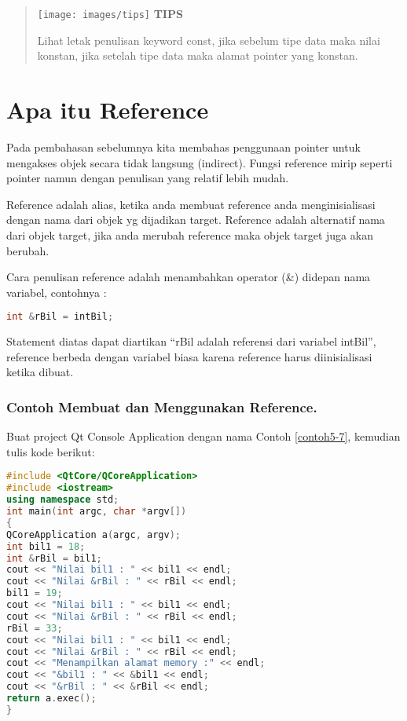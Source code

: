 \begin{quotation}
\texttt{[image: images/tips]}	\textbf{TIPS}
	
	Lihat
	letak penulisan keyword const, jika sebelum tipe data maka nilai
	konstan, jika setelah tipe data maka alamat pointer yang konstan.
\end{quotation}
 

\section{Apa itu Reference}\label{apa-itu-reference}

Pada pembahasan sebelumnya kita membahas penggunaan pointer untuk
mengakses objek secara tidak langsung (indirect). Fungsi reference mirip
seperti pointer namun dengan penulisan yang relatif lebih mudah.

Reference adalah alias, ketika anda membuat reference anda
menginisialisasi dengan nama dari objek yg dijadikan target. Reference
adalah alternatif nama dari objek target, jika anda merubah reference
maka objek target juga akan berubah.

Cara penulisan reference adalah menambahkan operator (\&) didepan nama
variabel, contohnya :

\begin{lstlisting}[language=c++, numbers=none]
int &rBil = intBil;
\end{lstlisting}

Statement diatas dapat diartikan ``rBil adalah referensi dari variabel
intBil'', reference berbeda dengan variabel biasa karena reference harus
diinisialisasi ketika dibuat.

\subsubsection*{Contoh  Membuat dan Menggunakan Reference.}

Buat project Qt Console Application dengan nama Contoh \ref{contoh5-7}, kemudian tulis
kode berikut:

\begin{lstlisting}[language=c++, caption=Membuat dan Menggunakan Reference, label=contoh5-7]
#include <QtCore/QCoreApplication>
#include <iostream>
using namespace std;
int main(int argc, char *argv[])
{
QCoreApplication a(argc, argv);
int bil1 = 18;
int &rBil = bil1;
cout << "Nilai bil1 : " << bil1 << endl;
cout << "Nilai &rBil : " << rBil << endl;
bil1 = 19;
cout << "Nilai bil1 : " << bil1 << endl;
cout << "Nilai &rBil : " << rBil << endl;
rBil = 33;
cout << "Nilai bil1 : " << bil1 << endl;
cout << "Nilai &rBil : " << rBil << endl;
cout << "Menampilkan alamat memory :" << endl;
cout << "&bil1 : " << &bil1 << endl;
cout << "&rBil : " << &rBil << endl;
return a.exec();
}
\end{lstlisting}


